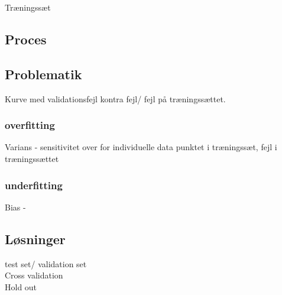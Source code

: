Træningssæt 

\subsection{Proces}
\subsection{Problematik}

Kurve med validationsfejl kontra fejl/ fejl på træningssættet. 

\subsubsection{overfitting}
Varians - sensitivitet over for individuelle data punktet i træningssæt, fejl i træningssættet
\subsubsection{underfitting}
Bias - 

\subsection{Løsninger}
test set/ validation set
\\ Cross validation
\\ Hold out

